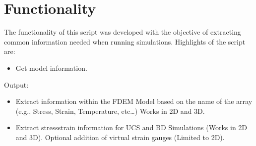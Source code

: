 \documentclass[letterpaper,10pt,english]{sphinxmanual}
\begin{document}
\section{Functionality}
\label{\detokenize{postprocessing_intro:functionality}}
\sphinxAtStartPar
The functionality of this script was developed with the objective of extracting common information needed when running simulations. Highlights of the script are:
\begin{itemize}
\item {} 
\sphinxAtStartPar
Get model information.

\end{itemize}

\begin{sphinxVerbatim}[commandchars=\\\{\}]
   
  
\end{sphinxVerbatim}

\sphinxAtStartPar
Output:

\begin{sphinxVerbatim}[commandchars=\\\{\}]
\end{sphinxVerbatim}
\begin{itemize}
\item {} 
\sphinxAtStartPar
Extract information within the FDEM Model based on the name of the array (e.g., Stress, Strain, Temperature, etc…) Works in 2D and 3D.

\item {} 
\sphinxAtStartPar
Extract stress\sphinxhyphen{}strain information for UCS and BD Simulations (Works in 2D and 3D). Optional addition of virtual strain gauges (Limited to 2D).

\end{itemize}

\begin{sphinxVerbatim}[commandchars=\\\{\}]
   
  
\end{sphinxVerbatim}
\end{document}
